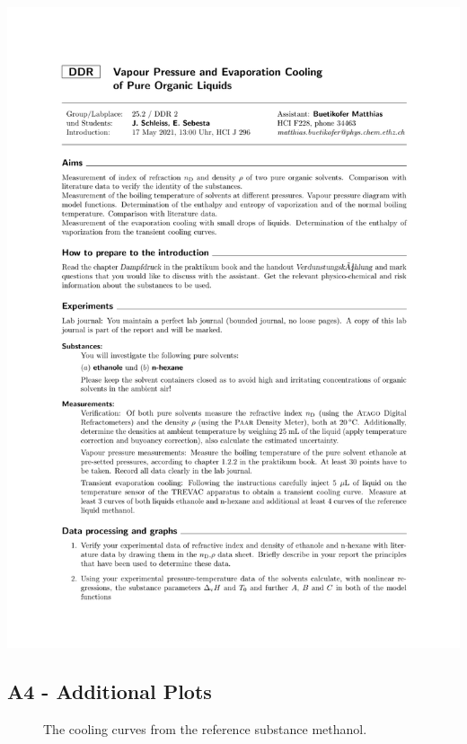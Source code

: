\documentclass[a4paper,abstracton]{article}	                       %
\begin{document}
\includegraphics[page = 2,width=\textwidth]{DDRtask.pdf}

\subsection*{A4 - Additional Plots}

\begin{figure}[H]
    \centering
    
    \caption{\label{fig:DDR4}The cooling curves from the reference substance methanol.}
\end{figure}
\end{document}
